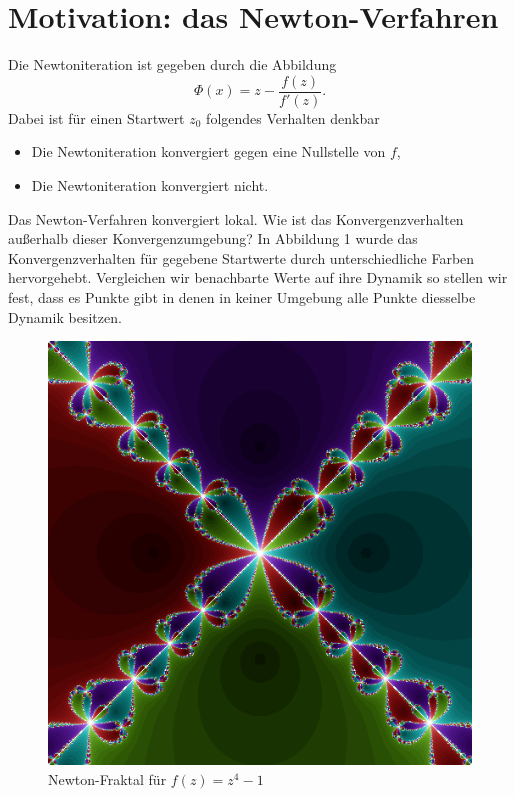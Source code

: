 \documentclass{mywork}
\begin{document}
\section{Motivation: das Newton-Verfahren}

Die Newtoniteration ist gegeben durch die Abbildung
\[
	\Phi(x)=z-\frac{f(z)}{f'(z)}.
\]
Dabei ist für einen Startwert $z_0$ folgendes Verhalten denkbar
\begin{itemize}
\item Die Newtoniteration konvergiert gegen eine Nullstelle von $f$,
\item Die Newtoniteration konvergiert nicht.
\end{itemize}

Das Newton-Verfahren konvergiert lokal. Wie ist das Konvergenzverhalten außerhalb dieser Konvergenzumgebung? In Abbildung 1 wurde das Konvergenzverhalten für gegebene Startwerte durch unterschiedliche Farben hervorgehebt. Vergleichen wir benachbarte Werte auf ihre Dynamik so stellen wir fest, dass es Punkte gibt in denen in keiner Umgebung alle Punkte diesselbe Dynamik besitzen.


\begin{figure}[H]
\centering
\includegraphics[scale=0.25]{fraktal.png}
\caption{Newton-Fraktal für $f(z)=z^4-1$}
\end{figure}
\end{document}
